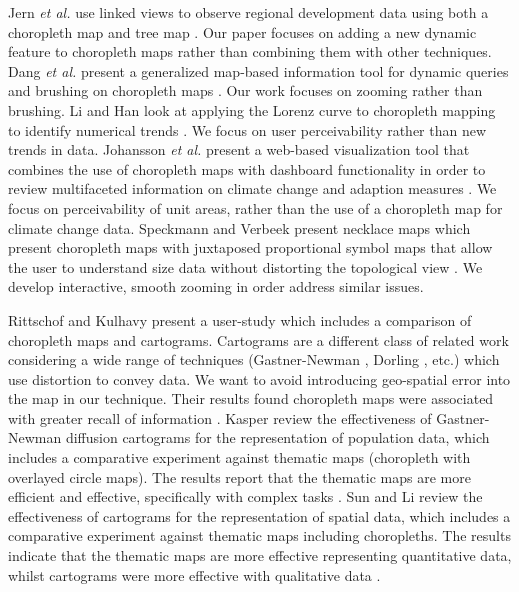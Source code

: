 Jern \textit{et al.} use linked views to observe regional development data using both a choropleth map and tree map \cite{jern2009treemaps}. Our paper focuses on adding a new dynamic feature to choropleth maps rather than combining them with other techniques. Dang \textit{et al.} present a generalized map-based information tool for dynamic queries and brushing on choropleth maps \cite{dang2001dynamic}. Our work focuses on zooming rather than brushing. Li and Han look at applying the Lorenz curve to choropleth mapping to identify numerical trends \cite{li2010discovery}. We focus on user perceivability rather than new trends in data. Johansson \textit{et al.} present a web-based visualization tool that combines the use of choropleth maps with dashboard functionality in order to review multifaceted information on climate change and adaption measures \cite{johansson2017visadapt}. We focus on perceivability of unit areas, rather than the use of a choropleth map for climate change data. Speckmann and Verbeek present necklace maps which present choropleth maps with juxtaposed proportional symbol maps that allow the user to understand size data without distorting the topological view \cite{speckmann2010necklace}. We develop interactive, smooth zooming in order address similar issues.

Rittschof and Kulhavy present a user-study which includes a comparison of choropleth maps and cartograms. Cartograms are a different class of related work considering a wide range of techniques (Gastner-Newman \cite{gastner2004diffusion}, Dorling \cite{dorling1993computer}, etc.) which use distortion to convey data. We  want to avoid introducing geo-spatial error into the map in our technique. Their results found choropleth maps were associated with greater recall of information \cite{rittschof1998learning}. Kasper review the effectiveness of Gastner-Newman diffusion cartograms \cite{kaspar2011empirical, gastner2004diffusion} for the representation of population data, which includes a comparative experiment against thematic maps (choropleth with overlayed circle maps). The results report that the thematic maps are more efficient and effective, specifically with complex tasks \cite{kaspar2011empirical}.
 Sun and Li review the effectiveness of cartograms for the representation of spatial data, which includes a comparative experiment against thematic maps including choropleths. The results indicate that the thematic maps are more effective representing quantitative data, whilst cartograms were more effective with qualitative data \cite{sun2010effectiveness}.
 
